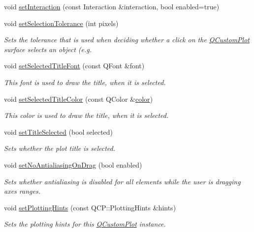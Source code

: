 \begin{DoxyCompactItemize}
void \hyperlink{a00116_af9af5370ddc6e57f3e15809c1576cc38}{set\+Interaction} (const Interaction \&interaction, bool enabled=true)
\item 
void \hyperlink{a00116_a4dc31241d7b09680950e19e5f971ed93}{set\+Selection\+Tolerance} (int pixels)
\begin{DoxyCompactList}\small\item\em Sets the tolerance that is used when deciding whether a click on the \hyperlink{a00030_d8/d00/a00186}{Q\+Custom\+Plot} surface selects an object (e.\+g. \end{DoxyCompactList}\item 
void \hyperlink{a00116_a2face1cc6d467f27aa1a6f3ba5ba112d}{set\+Selected\+Title\+Font} (const Q\+Font \&font)
\begin{DoxyCompactList}\small\item\em This {\itshape font} is used to draw the title, when it is selected. \end{DoxyCompactList}\item 
void \hyperlink{a00116_ad0897d7ba31a3994d7323f568cdcd2d8}{set\+Selected\+Title\+Color} (const Q\+Color \&\hyperlink{a00116_ae35093fbf4f645dcefd930ca8c68b622}{color})
\begin{DoxyCompactList}\small\item\em This {\itshape color} is used to draw the title, when it is selected. \end{DoxyCompactList}\item 
void \hyperlink{a00116_aa89e06c04804ff2a0994ccb1aa80d131}{set\+Title\+Selected} (bool selected)
\begin{DoxyCompactList}\small\item\em Sets whether the plot title is selected. \end{DoxyCompactList}\item 
void \hyperlink{a00116_a775bdcb6329d44701aeaa6135b0e5265}{set\+No\+Antialiasing\+On\+Drag} (bool enabled)
\begin{DoxyCompactList}\small\item\em Sets whether antialiasing is disabled for all elements while the user is dragging axes ranges. \end{DoxyCompactList}\item 
void \hyperlink{a00116_a94a33cbdadbbac5934843508bcfc210d}{set\+Plotting\+Hints} (const Q\+C\+P\+::\+Plotting\+Hints \&hints)
\begin{DoxyCompactList}\small\item\em Sets the plotting hints for this \hyperlink{a00030_d8/d00/a00186}{Q\+Custom\+Plot} instance. \end{DoxyCompactList}\item 

\end{DoxyCompactItemize}
